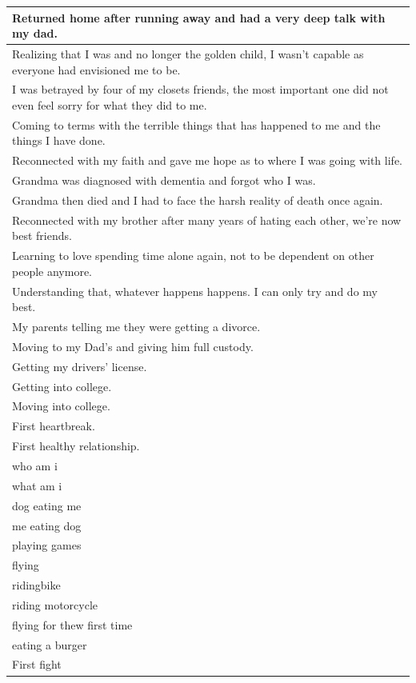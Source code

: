 \documentclass[
  .7em,
  letterpaper,
  DIV=11,
  numbers=noendperiod]{scrartcl}
\begin{document}
\begin{table}
\begin{tabular}{l}
\hline
Returned home after running away and had a very deep talk with my dad.\\
\hline
Realizing that I was and no longer the golden child, I wasn't capable as everyone had envisioned me to be.\\
\hline
I was betrayed by four of my closets friends, the most important one did not even feel sorry for what they did to me.\\
\hline
Coming to terms with the terrible things that has happened to me and the things I have done.\\
\hline
Reconnected with my faith and gave me hope as to where I was going with life.\\
\hline
Grandma was diagnosed with dementia and forgot who I was.\\
\hline
Grandma then died and I had to face the harsh reality of death once again.\\
\hline
Reconnected with my brother after many years of hating each other, we're now best friends.\\
\hline
Learning to love spending time alone again, not to be dependent on other people anymore.\\
\hline
Understanding that, whatever happens happens. I can only try and do my best.\\
\hline
My parents telling me they were getting a divorce.\\
\hline
Moving to my Dad's and giving him full custody.\\
\hline
Getting my drivers' license.\\
\hline
Getting into college.\\
\hline
Moving into college.\\
\hline
First heartbreak.\\
\hline
First healthy relationship.\\
\hline
who am i\\
\hline
what am i\\
\hline
dog eating me\\
\hline
me eating dog\\
\hline
playing games\\
\hline
flying\\
\hline
ridingbike\\
\hline
riding motorcycle\\
\hline
flying for thew first time\\
\hline
eating a burger\\
\hline
First fight\\
\hline

\end{tabular}
\end{table}
\end{document}
